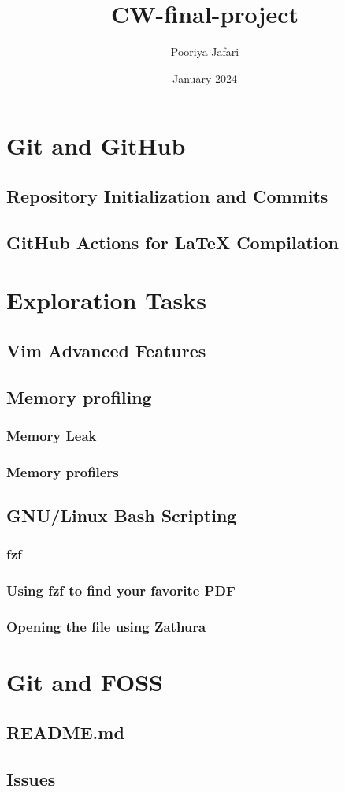 \documentclass[titlepage]{article}
\title{CW-final-project}
\author{Pooriya Jafari}
\date{January 2024}
\begin{document}
\maketitle
\tableofcontents

\newpage

\section{Git and GitHub}
\subsection{Repository Initialization and Commits}

\subsection{GitHub Actions for LaTeX Compilation}

\newpage

\section{Exploration Tasks}
\subsection{Vim Advanced Features}

\subsection{Memory profiling}
\subsubsection{Memory Leak}
\subsubsection{Memory profilers}
\subsection{GNU/Linux Bash Scripting}
\subsubsection{fzf}
\subsubsection{Using fzf to find your favorite PDF}
\subsubsection{Opening the file using Zathura}

\section{Git and FOSS}
\subsection{README.md}
\subsection{Issues}
\end{document}
